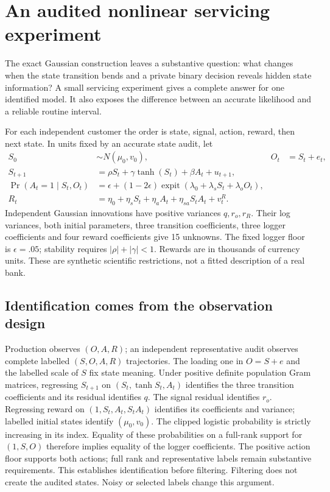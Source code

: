\section{An audited nonlinear servicing experiment}
\label{c7:nonlinear}
The exact Gaussian construction leaves a substantive question: what changes
when the state transition bends and a private binary decision reveals hidden
state information? A small servicing experiment gives a complete answer for
one identified model. It also exposes the difference between an accurate
likelihood and a reliable routine interval.

For each independent customer the order is state, signal, action, reward,
then next state. In units fixed by an accurate state audit, let
\begin{align}
 S_0&\sim N(\mu_0,v_0), & O_t&=S_t+e_t,\\
 S_{t+1}&=\rho S_t+\gamma\tanh(S_t)+\beta A_t+u_{t+1},\nonumber\\
 \Pr(A_t=1\mid S_t,O_t)&=\epsilon+(1-2\epsilon)
       \operatorname{expit}(\lambda_0+\lambda_sS_t+\lambda_oO_t),\nonumber\\
 R_t&=\eta_0+\eta_s S_t+\eta_a A_t+\eta_{sa}S_tA_t+v_t^R.
 \label{c7:nonlinear-law}
\end{align}
Independent Gaussian innovations have positive variances $q,r_o,r_R$.
Their log variances, both initial parameters, three transition coefficients,
three logger coefficients and four reward coefficients give 15 unknowns.
The fixed logger floor is $\epsilon=.05$; stability requires
$|\rho|+|\gamma|<1$. Rewards are in thousands of currency units. These are
synthetic scientific restrictions, not a fitted description of a real bank.

\subsection{Identification comes from the observation design}
Production observes $(O,A,R)$; an independent representative audit observes
complete labelled $(S,O,A,R)$ trajectories. The loading one in $O=S+e$ and
the labelled scale of $S$ fix state meaning. Under positive definite population
Gram matrices, regressing $S_{t+1}$ on $(S_t,\tanh S_t,A_t)$ identifies the
three transition coefficients and its residual identifies $q$. The signal
residual identifies $r_o$. Regressing reward on $(1,S_t,A_t,S_tA_t)$ identifies
its coefficients and variance; labelled initial states identify $(\mu_0,v_0)$.
The clipped logistic probability is strictly increasing in its index. Equality
of these probabilities on a full-rank support for $(1,S,O)$ therefore implies
equality of the logger coefficients. The positive action floor supports both
actions; full rank and representative labels remain substantive requirements.
This establishes identification before filtering. Filtering does not create
the audited states. Noisy or selected labels change this argument.

